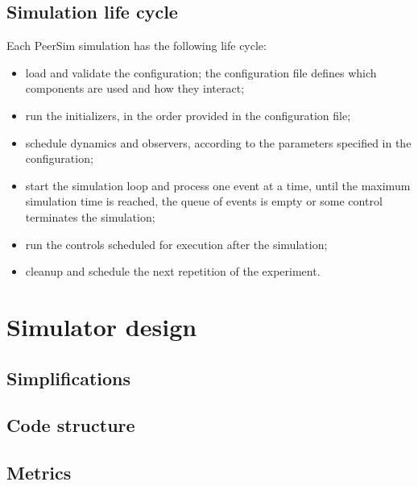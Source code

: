 \subsection{Simulation life cycle}
Each PeerSim simulation has the following life cycle:
\begin{itemize}
	\item load and validate the configuration; the configuration file defines which components are used and how they interact;
	\item run the initializers, in the order provided in the configuration file;
	\item schedule dynamics and observers, according to the parameters specified in the configuration;
	\item start the simulation loop and process one event at a time, until the maximum simulation time is reached, the queue of events is empty or some control terminates the simulation;
	\item run the controls scheduled for execution after the simulation;
	\item cleanup and schedule the next repetition of the experiment.
\end{itemize}

\section{Simulator design}

\subsection{Simplifications}

\subsection{Code structure}

\subsection{Metrics}
